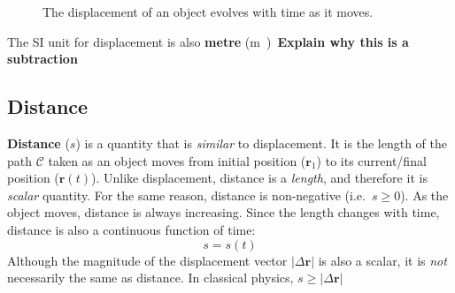 \begin{figure}[ht]
  \centering
  \caption{The displacement of an object evolves with time as it moves.}
\end{figure}


The SI unit for displacement is also \textbf{metre} (\si\metre).



\textbf{Explain why this is a subtraction}


\subsection{Distance}

\textbf{Distance} ($s$) is a quantity that is \emph{similar} to
displacement. It is the length of the path $\mathcal C$ taken as an object
moves from initial position ($\mathbf r_1$) to its current/final position
($\mathbf r(t)$). Unlike displacement, distance is a \emph{length}, and therefore
it is \emph{scalar} quantity. For the same reason, distance is non-negative
(i.e.\ $s\geq 0$). As the object moves, distance is always increasing. Since
the length changes with time, distance is also a continuous function of time:
\begin{equation*}
  \boxed{s=s(t)}
\end{equation*}
Although the magnitude of the displacement vector $|\Delta\mathbf r|$ is also a
scalar, it is \emph{not} necessarily the same as distance. In classical
physics,  $s\geq |\Delta\mathbf r|$

